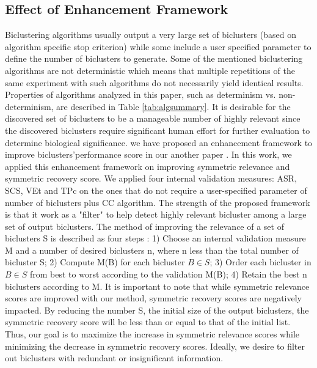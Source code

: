 \subsection{Effect of Enhancement Framework}
Biclustering algorithms usually output a very large set of biclusters (based on algorithm specific stop criterion) while some include a user specified parameter to define the number of biclusters to generate. Some of the mentioned biclustering algorithms are not deterministic which means that multiple repetitions of the same experiment with such algorithms do not necessarily yield identical results. Properties of algorithms analyzed in this paper, such as determinism vs. non-determinism, are described in Table \ref{tab:algsummary}. It is desirable for the discovered set of biclusters to be a manageable number of highly relevant since the discovered biclusters require significant human effort for further evaluation to determine biological significance. we have proposed an enhancement framework to improve biclusters'performance score in our another paper \cite{dale2018performance}. In this work, we applied this enhancement framework on improving symmetric relevance and symmetric recovery score. We applied four internal validation measures: ASR, SCS, VEt and TPc on the ones that do not require a user-specified parameter of number of biclusters plus CC algorithm. The strength of the proposed framework is that it work as a "filter" to help detect highly relevant bicluster among a large set of output biclusters. The method of improving the relevance of a set of biclusters S is described as four steps : 1) Choose an internal validation measure M and a number of desired biclusters n, where n less than the total number of bicluster S; 2) Compute M(B) for each bicluster $B \in S$; 3) Order each bicluster in $B\in     S$ from best to worst according to the validation M(B); 4) Retain the best n biclusters according to M. It is important to note that while symmetric relevance scores are improved with our method, symmetric recovery scores are negatively impacted. By reducing the number S, the initial size of the output biclusters, the symmetric recovery score will be less than or equal to that of the initial list. Thus, our goal is to maximize the increase in symmetric relevance scores while minimizing the decrease in symmetric recovery scores. Ideally, we desire to filter out biclusters with redundant or insignificant information.

